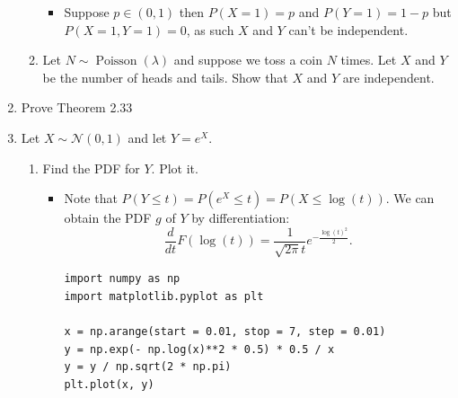 \documentclass{article}
\begin{document}
\begin{enumerate}
\begin{enumerate}
				\begin{itemize}
					\item Suppose $p \in (0, 1)$ then $P(X = 1) = p$ and $P(Y = 1) = 1 - p$ but $P(X = 1, Y = 1) = 0$, as such $X$ and $Y$ can't be independent.
				\end{itemize}
			\item Let $N \sim \operatorname{Poisson}(\lambda)$ and suppose we toss a coin $N$ times. Let $X$ and $Y$ be the number of heads and tails. Show that $X$ and $Y$ are independent.
		\end{enumerate}
	\item Prove Theorem 2.33
	\item Let $X \sim \mathcal{N}(0, 1)$ and let $Y = e^X$.
		\begin{enumerate}
			\item Find the PDF for $Y$. Plot it.
				\begin{itemize}
					\item Note that $P(Y \leq t) = P(e^X \leq t) = P(X \leq \log(t))$. We can obtain the PDF $g$ of $Y$ by differentiation:
					$$
					\frac{d}{dt} F(\log(t)) = \frac{1}{\sqrt{2\pi} t} e^{- \frac{\log(t)^2}{2}}.
					$$
					\begin{verbatim}
import numpy as np
import matplotlib.pyplot as plt

x = np.arange(start = 0.01, stop = 7, step = 0.01)
y = np.exp(- np.log(x)**2 * 0.5) * 0.5 / x
y = y / np.sqrt(2 * np.pi)
plt.plot(x, y)


\end{verbatim}
\end{itemize}
\end{enumerate}
\end{enumerate}
\end{document}
